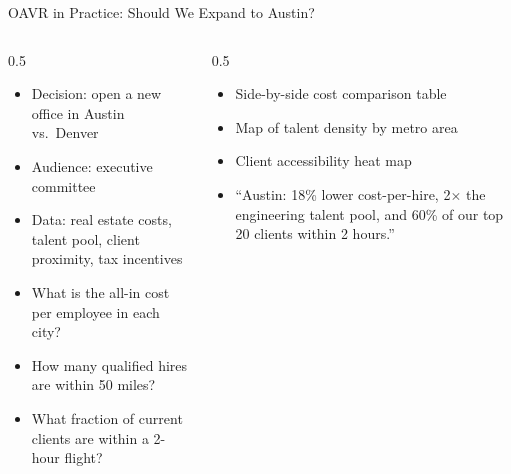 \documentclass[aspectratio=169]{beamer}
\begin{document}
\begin{frame}{OAVR in Practice: Should We Expand to Austin?}
\begin{columns}[T]
\begin{column}{0.5\textwidth}
\begin{shadedbox}[title=\textbf{Orient}]
\begin{itemize}\scriptsize
  \item Decision: open a new office in Austin vs.\ Denver
  \item Audience: executive committee
  \item Data: real estate costs, talent pool, client proximity, tax incentives
\end{itemize}
\end{shadedbox}
\begin{shadedbox}[title=\textbf{Ask}]
\begin{itemize}\scriptsize
  \item What is the all-in cost per employee in each city?
  \item How many qualified hires are within 50 miles?
  \item What fraction of current clients are within a 2-hour flight?
\end{itemize}
\end{shadedbox}
\end{column}
\begin{column}{0.5\textwidth}
\begin{shadedbox}[title=\textbf{Visualize}]
\begin{itemize}\scriptsize
  \item Side-by-side cost comparison table
  \item Map of talent density by metro area
  \item Client accessibility heat map
\end{itemize}
\end{shadedbox}
\begin{shadedbox}[title=\textbf{Recommend}]
\begin{itemize}\scriptsize
  \item ``Austin: 18\% lower cost-per-hire, 2$\times$ the engineering talent pool, and 60\% of our top 20 clients within 2 hours.''
\end{itemize}
\end{shadedbox}
\end{column}
\end{columns}
\end{frame}
\end{document}
